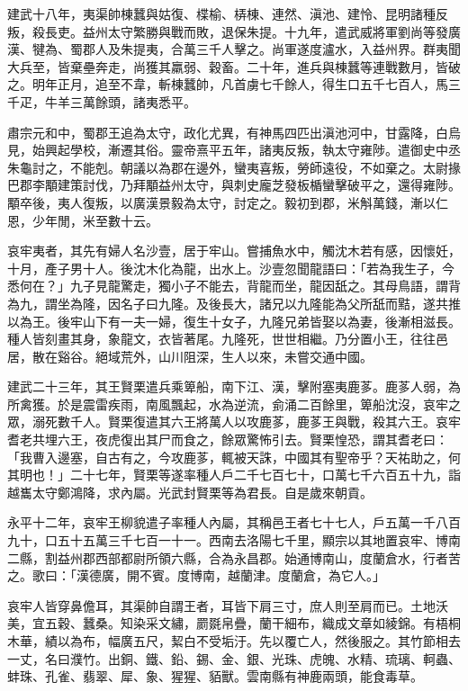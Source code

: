 \begin{pinyinscope}
建武十八年，夷渠帥棟蠶與姑復、楪榆、梇棟、連然、滇池、建怜、昆明諸種反叛，殺長吏。益州太守繁勝與戰而敗，退保朱提。十九年，遣武威將軍劉尚等發廣漢、犍為、蜀郡人及朱提夷，合萬三千人擊之。尚軍遂度瀘水，入益州界。群夷聞大兵至，皆棄壘奔走，尚獲其羸弱、穀畜。二十年，進兵與棟蠶等連戰數月，皆破之。明年正月，追至不韋，斬棟蠶帥，凡首虜七千餘人，得生口五千七百人，馬三千疋，牛羊三萬餘頭，諸夷悉平。

肅宗元和中，蜀郡王追為太守，政化尤異，有神馬四匹出滇池河中，甘露降，白烏見，始興起學校，漸遷其俗。靈帝熹平五年，諸夷反叛，執太守雍陟。遣御史中丞朱龜討之，不能剋。朝議以為郡在邊外，蠻夷喜叛，勞師遠役，不如棄之。太尉掾巴郡李顒建策討伐，乃拜顒益州太守，與刺史龐芝發板楯蠻擊破平之，還得雍陟。顒卒後，夷人復叛，以廣漢景毅為太守，討定之。毅初到郡，米斛萬錢，漸以仁恩，少年閒，米至數十云。

哀牢夷者，其先有婦人名沙壹，居于牢山。嘗捕魚水中，觸沈木若有感，因懷妊，十月，產子男十人。後沈木化為龍，出水上。沙壹忽聞龍語曰：「若為我生子，今悉何在？」九子見龍驚走，獨小子不能去，背龍而坐，龍因舐之。其母鳥語，謂背為九，謂坐為隆，因名子曰九隆。及後長大，諸兄以九隆能為父所舐而黠，遂共推以為王。後牢山下有一夫一婦，復生十女子，九隆兄弟皆娶以為妻，後漸相滋長。種人皆刻畫其身，象龍文，衣皆著尾。九隆死，世世相繼。乃分置小王，往往邑居，散在谿谷。絕域荒外，山川阻深，生人以來，未嘗交通中國。

建武二十三年，其王賢栗遣兵乘箄船，南下江、漢，擊附塞夷鹿茤。鹿茤人弱，為所禽獲。於是震雷疾雨，南風飄起，水為逆流，侴涌二百餘里，箄船沈沒，哀牢之眾，溺死數千人。賢栗復遣其六王將萬人以攻鹿茤，鹿茤王與戰，殺其六王。哀牢耆老共埋六王，夜虎復出其尸而食之，餘眾驚怖引去。賢栗惶恐，謂其耆老曰：「我曹入邊塞，自古有之，今攻鹿茤，輒被天誅，中國其有聖帝乎？天祐助之，何其明也！」二十七年，賢栗等遂率種人戶二千七百七十，口萬七千六百五十九，詣越巂太守鄭鴻降，求內屬。光武封賢栗等為君長。自是歲來朝貢。

永平十二年，哀牢王柳貌遣子率種人內屬，其稱邑王者七十七人，戶五萬一千八百九十，口五十五萬三千七百一十一。西南去洛陽七千里，顯宗以其地置哀牢、博南二縣，割益州郡西部都尉所領六縣，合為永昌郡。始通博南山，度蘭倉水，行者苦之。歌曰：「漢德廣，開不賓。度博南，越蘭津。度蘭倉，為它人。」

哀牢人皆穿鼻儋耳，其渠帥自謂王者，耳皆下肩三寸，庶人則至肩而已。土地沃美，宜五穀、蠶桑。知染采文繡，罽毲帛疊，蘭干細布，織成文章如綾錦。有梧桐木華，績以為布，幅廣五尺，絜白不受垢汙。先以覆亡人，然後服之。其竹節相去一丈，名曰濮竹。出銅、鐵、鉛、錫、金、銀、光珠、虎魄、水精、琉璃、軻蟲、蚌珠、孔雀、翡翠、犀、象、猩猩、貊獸。雲南縣有神鹿兩頭，能食毒草。


\end{pinyinscope}
